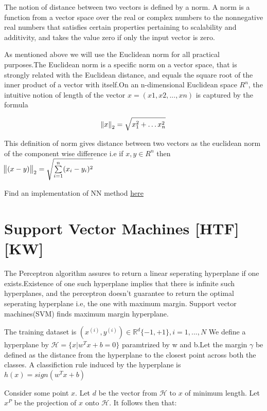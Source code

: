 \documentclass[12pt]{article}
\begin{document}
 The notion of distance between two vectors is defined by a norm. A norm is a function from a vector space over the real or complex numbers to the nonnegative real numbers that satisfies certain properties pertaining to scalability and additivity, and takes the value zero if only the input vector is zero.
 
 As mentioned above we will use the Euclidean norm for all practical purposes.The Euclidean norm  is a specific norm on a vector space, that is strongly related with the Euclidean distance, and equals the square root of the inner product of a vector with itself.On an n-dimensional Euclidean space $ R^{n}$, the intuitive notion of length of the vector $x = (x1, x2, ..., xn)$ is captured by the formula
 
 $$\norm{x}_{2}= \sqrt{x_{1}^{2}+ \dots x_{n}^{2}}$$
 
 
This definition of norm gives distance between two vectors as the euclidean norm of the component wise difference i.e if $x, y \in R^{n}$ then \\ $ \norm{(x-y)}_{2} = \sqrt{\sum\limits_{i=1}^{n}(x_{i}-y_{i})^{2}} $
 
 \vspace{0.4 cm}
 Find an implementation of NN method \href{https://github.com/aswin16/ML-REPORT/blob/master/codes/NN_MNIST.ipynb}{here}
 
 
 
 
 
 \section{Support Vector Machines \tiny{[HTF][KW]}} 
 
 The Perceptron algorithm assures to return a linear seperating hyperplane if one exists.Existence of one  such  hyperplane implies that there is infinite such hyperplanes, and the perceptron doesn't guarantee to return the optimal seperating hyperplane i.e, the one with maximum margin.
 Support vector machines(SVM) finds maximum margin hyperplane. 
 
 The training dataset is $(x^{(i)}, y^{(i)}) \in \mathbb{R}^{d} \{-1,+1\},i = 1,...,N$ We define a  hyperplane by $\mathcal{H}=\{x \vert w^{T}x + b =0\}$ paramtrized by w and b.Let the margin $\gamma$ be defined as the distance from the hyperplane to the closest point across both the classes. A classifiction rule induced by the hyperplane is $h(x) = sign(w^{T}x+ b)$
 
 
 Consider some point $x$. Let $d$ be the vector from $\mathcal{H}$ to $x$ of minimum length. Let $x^{P}$ be the projection of $x$ onto $\mathcal{H}$. It follows then that:
 
\end{document}
